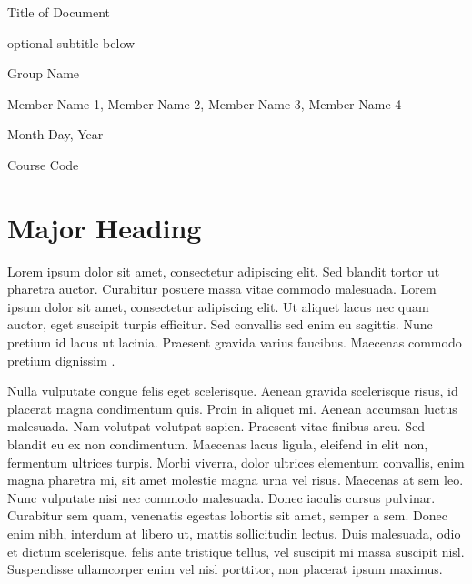 \documentclass[12pt]{article}
\newcommand\titleofdoc{Title of Document} %
\newcommand\GroupName{Group Name} %
\begin{document}
\begin{titlepage}
   \begin{center}
        \vspace*{4cm} %

        \Huge{\titleofdoc} 

        \vspace{0.5cm}
        \LARGE{optional subtitle below}
            
        \vspace{3 cm}
        \Large{\GroupName}
       
        \vspace{0.25cm}
        \large{Member Name 1, Member Name 2, Member Name 3, Member Name 4}
       
        \vspace{3 cm}
        \Large{Month Day, Year}
        
        \vspace{0.25 cm}
        \Large{Course Code}
       

       \vfill
    \end{center}
\end{titlepage}

\setcounter{page}{2}
\pagestyle{fancy}
\fancyhf{}
\rhead{\thepage}
\lhead{\GroupName; \titleofdoc}

\section*{Major Heading} %

Lorem ipsum dolor sit amet, consectetur adipiscing elit. Sed blandit tortor ut pharetra auctor. Curabitur posuere massa vitae commodo malesuada. Lorem ipsum dolor sit amet, consectetur adipiscing elit. Ut aliquet lacus nec quam auctor, eget suscipit turpis efficitur. Sed convallis sed enim eu sagittis. Nunc pretium id lacus ut lacinia. Praesent gravida varius faucibus. Maecenas commodo pretium dignissim \autocite{cohen_quantifying_2020}. 

Nulla vulputate congue felis eget scelerisque. Aenean gravida scelerisque risus, id placerat magna condimentum quis. Proin in aliquet mi. Aenean accumsan luctus malesuada. Nam volutpat volutpat sapien. Praesent vitae finibus arcu. Sed blandit eu ex non condimentum. Maecenas lacus ligula, eleifend in elit non, fermentum ultrices turpis. Morbi viverra, dolor ultrices elementum convallis, enim magna pharetra mi, sit amet molestie magna urna vel risus. Maecenas at sem leo. Nunc vulputate nisi nec commodo malesuada. Donec iaculis cursus pulvinar. Curabitur sem quam, venenatis egestas lobortis sit amet, semper a sem. Donec enim nibh, interdum at libero ut, mattis sollicitudin lectus. Duis malesuada, odio et dictum scelerisque, felis ante tristique tellus, vel suscipit mi massa suscipit nisl. Suspendisse ullamcorper enim vel nisl porttitor, non placerat ipsum maximus.
\end{document}
